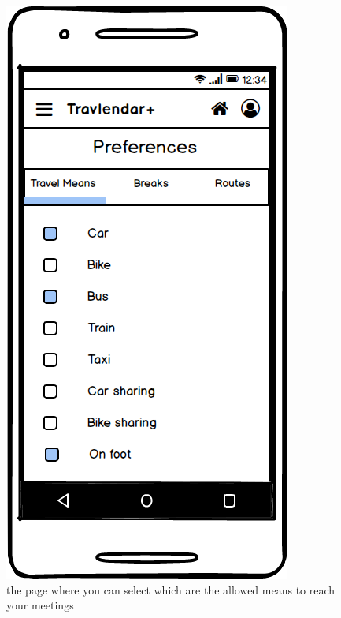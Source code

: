 \documentclass[11pt]{article}
\begin{document}
	\begin{figure}
		\centering
		\includegraphics[width=0.7\linewidth]{PreferencesTravelMeans.png}
		\caption{the page where you can select which are the allowed means to reach your meetings}
		\label{fig:preferencestravelmeans}
	\end{figure}
	
\end{document}
